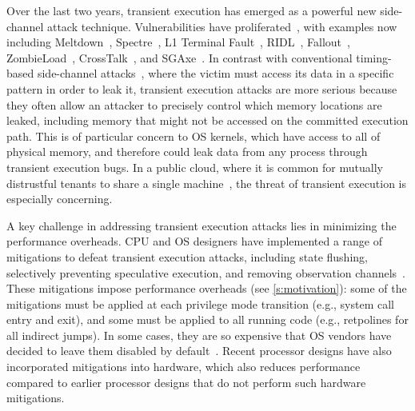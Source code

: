 
Over the last two years, transient execution has emerged as a
powerful new side-channel attack technique.  Vulnerabilities have
proliferated~\cite{sok:transient,hill:survey}, with examples now including Meltdown~\cite{lipp:meltdown},
Spectre~\cite{kocher:spectre}, L1 Terminal Fault~\cite{bulck:foreshadow}, RIDL~\cite{schaik:ridl},
Fallout~\cite{canella:fallout}, ZombieLoad~\cite{schwarz:zombieload},
CrossTalk~\cite{ragab:crosstalk}, and SGAxe~\cite{sgaxe}.  In contrast
with conventional timing-based side-channel attacks~\cite{kocher:timing},
where the victim must access its data in a specific pattern in order
to leak it, transient execution attacks are more serious because they
often allow an attacker to precisely control which memory locations are
leaked, including memory that might not be accessed on the committed
execution path.  This is of particular concern to OS kernels, which have
access to all of physical memory, and therefore could leak data from any
process through transient execution bugs.  In a public cloud,
where it is common for mutually distrustful tenants to share
a single machine~\cite{borg, cpi2}, the threat of transient execution
is especially concerning.

A key challenge in addressing transient execution attacks lies in
minimizing the performance overheads.  CPU and OS designers have
implemented a range of mitigations to defeat transient execution
attacks, including state flushing, selectively preventing speculative
execution, and removing observation channels~\cite{sok:transient}.
These mitigations impose performance overheads (see
\autoref{s:motivation}): some of the mitigations must be applied at
each privilege mode transition (e.g., system call entry and exit), and
some must be applied to all running code (e.g., retpolines for all
indirect jumps).  In some cases, they are so expensive that OS vendors
have decided to leave them disabled by default~\cite{apple_support,
  microsoft_support}.  Recent processor designs have also incorporated
mitigations into hardware, which also reduces performance compared to
earlier processor designs that do not perform such hardware
mitigations.


